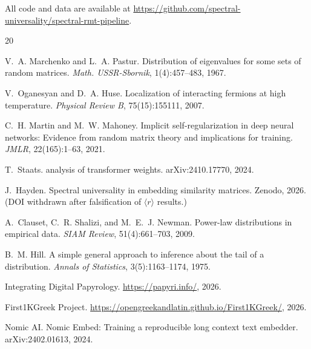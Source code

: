 \documentclass[12pt,letterpaper]{article}
\newcommand{\rbar}{\langle r \rangle}
\begin{document}
All code and data are available at
\url{https://github.com/spectral-universality/spectral-rmt-pipeline}.



\begin{thebibliography}{20}

V.~A. Marchenko and L.~A. Pastur.
\newblock Distribution of eigenvalues for some sets of random matrices.
\newblock \emph{Math. USSR-Sbornik}, 1(4):457--483, 1967.

V.~Oganesyan and D.~A. Huse.
\newblock Localization of interacting fermions at high temperature.
\newblock \emph{Physical Review B}, 75(15):155111, 2007.

C.~H. Martin and M.~W. Mahoney.
\newblock Implicit self-regularization in deep neural networks: Evidence from
  random matrix theory and implications for training.
\newblock \emph{JMLR}, 22(165):1--63, 2021.

T.~Staats.
 analysis of transformer weights.
\newblock arXiv:2410.17770, 2024.

J.~Hayden.
\newblock Spectral universality in embedding similarity matrices.
\newblock Zenodo, 2026.
\newblock (DOI withdrawn after falsification of $\rbar$ results.)

A.~Clauset, C.~R. Shalizi, and M.~E.~J. Newman.
\newblock Power-law distributions in empirical data.
\newblock \emph{SIAM Review}, 51(4):661--703, 2009.

B.~M. Hill.
\newblock A simple general approach to inference about the tail of a
  distribution.
\newblock \emph{Annals of Statistics}, 3(5):1163--1174, 1975.

{Integrating Digital Papyrology}.
\newblock \url{https://papyri.info/}, 2026.

{First1KGreek Project}.
\newblock \url{https://opengreekandlatin.github.io/First1KGreek/}, 2026.

{Nomic AI}.
\newblock Nomic Embed: Training a reproducible long context text embedder.
\newblock arXiv:2402.01613, 2024.


\end{thebibliography}
\end{document}
